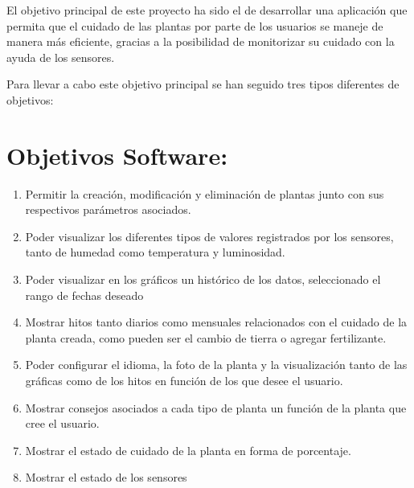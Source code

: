 
El objetivo principal de este proyecto ha sido el de desarrollar una aplicación que permita que el cuidado de las plantas por parte de los usuarios se maneje de manera más eficiente, gracias a la posibilidad de monitorizar su cuidado con la ayuda de los sensores.

Para llevar a cabo este objetivo principal se han seguido tres tipos diferentes de objetivos:

\section{Objetivos Software:}
\begin{enumerate}
    \item {Permitir la creación, modificación y eliminación de plantas junto con sus respectivos parámetros asociados.}
    \item {Poder visualizar los diferentes tipos de valores registrados por los sensores, tanto de humedad como temperatura y luminosidad.}
    \item {Poder visualizar en los gráficos un histórico de los datos, seleccionado el rango de fechas deseado}
    \item {Mostrar hitos tanto diarios como mensuales relacionados con el cuidado de la planta creada, como pueden ser el cambio de tierra o agregar fertilizante.}
    \item {Poder configurar el idioma, la foto de la planta y la visualización tanto de las gráficas como de los hitos en función de los que desee el usuario.}
    \item {Mostrar consejos asociados a cada tipo de planta un función de la planta que cree el usuario.}
    \item {Mostrar el estado de cuidado de la planta en forma de porcentaje.}
    \item {Mostrar el estado de los sensores}
\end{enumerate}

